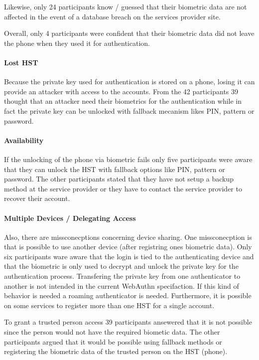 \documentclass[runningheads]{llncs}
\begin{document}
Likewise, only 24 participants know / guessed that their biometric data are not affected in the event of a database breach on the services provider site.

Overall, only 4 participants were confident that their biometric data did not leave the phone when they used it for authentication.

\paragraph{Lost HST}
Because the private key used for authentication is stored on a phone, losing it can provide an attacker with access to the accounts. From the 42 participants 39 thought that an attacker need their biometrics for the authentication while in fact the private key can be unlocked with fallback mecanism likes PIN, pattern or password.

\paragraph{Availability}
If the unlocking of the phone via biometric fails only five participants were aware that they can unlock the HST with fallback options like PIN, pattern or password. The other participants stated that they have not setup a backup method at the service provider or they have to contact the service provider to recover their account.

\paragraph{Multiple Devices / Delegating Access}
Also, there are missconecptions concerning device sharing. One missconecption is that is possible to use another device (after registring ones biometric data). Only six participants ware aware that the login is tied to the authenticating device and that the biometric is only used to decrypt and unlock the private key for the authentication process. Transfering the private key from one authenticator to another is not intended in the current WebAuthn specifaction. If this kind of behavior is needed a roaming authenticator is needed. Furthermore, it is possible on some services to register more than one HST for a single account.

To grant a trusted person access 39 participants ansewered that it is not possible since the person would not have the required biometic data. The other participants argued that it would be possible using fallback methods or registering the biometric data of the trusted person on the HST (phone).
\end{document}
